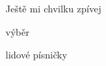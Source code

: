 \vspace*{5cm}
\begin{center}
\begin{LARGE}
	Ještě mi chvilku zpívej
\end{LARGE}

\begin{large}
	výběr
	
	lidové písničky
\end{large}
\vspace{1cm}
\end{center}
\newpage